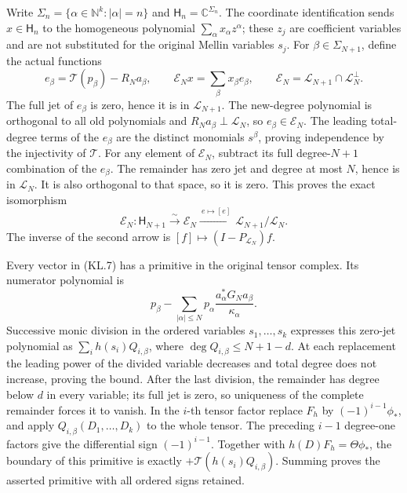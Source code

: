Write \(\Sigma_n=\{\alpha\in\mathbb N^k:|\alpha|=n\}\)
and \(\mathsf H_n=\mathbb C^{\Sigma_n}\).  The coordinate
identification sends \(x\in\mathsf H_n\) to the homogeneous
polynomial \(\sum_\alpha x_\alpha z^\alpha\); these \(z_j\)
are coefficient variables and are not substituted for the original
Mellin variables \(s_j\).
For \(\beta\in\Sigma_{N+1}\), define the actual functions
\[
 e_\beta=\mathcal T(p_\beta)-R_Na_\beta,
 \qquad \mathscr E_N x=\sum_\beta x_\beta e_\beta,
 \qquad
 \mathcal E_N=\mathcal L_{N+1}\cap\mathcal L_N^\perp.
                                                               \tag{KL.7}
\]
The full jet of \(e_\beta\) is zero, hence it is in
\(\mathcal L_{N+1}\).  The new-degree polynomial is orthogonal
to all old polynomials and \(R_Na_\beta\perp\mathcal L_N\),
so \(e_\beta\in\mathcal E_N\).
The leading total-degree terms of the \(e_\beta\) are the distinct
monomials \(s^\beta\), proving independence by the injectivity of
\(\mathcal T\).  For any element of \(\mathcal E_N\), subtract
its full degree-\(N+1\) combination of the \(e_\beta\).  The
remainder has zero jet and degree at most \(N\), hence is in
\(\mathcal L_N\).  It is also orthogonal to that space, so it is
zero.  This proves the exact isomorphism
\[
 \mathscr E_N:\mathsf H_{N+1}\xrightarrow{\sim}\mathcal E_N
       \xrightarrow{\ e\mapsto[e]\ }
                            \mathcal L_{N+1}/\mathcal L_N.
                                                               \tag{KL.8}
\]
The inverse of the second arrow is \([f]\mapsto(I-P_{\mathcal L_N})f\).

Every vector in (KL.7) has a primitive in the original tensor complex.
Its numerator polynomial is
\[
 p_\beta-\sum_{|\alpha|\leq N}
           p_\alpha\frac{a_\alpha^*G_Na_\beta}{\kappa_\alpha}.
                                                               \tag{KL.9}
\]
Successive monic division in the ordered variables
\(s_1,\ldots,s_k\) expresses this zero-jet polynomial as
\(\sum_i h(s_i)Q_{i,\beta}\), where
\(\deg Q_{i,\beta}\leq N+1-d\).  At each replacement the
leading power of the divided variable decreases and total degree
does not increase, proving the bound.  After the last division,
the remainder has degree below \(d\) in every variable; its full
jet is zero, so uniqueness of the complete remainder forces it to
vanish.  In the \(i\)-th tensor factor replace \(F_h\) by
\((-1)^{i-1}\phi_*\), and apply \(Q_{i,\beta}(D_1,\ldots,D_k)\)
to the whole tensor.  The preceding \(i-1\) degree-one factors
give the differential sign \((-1)^{i-1}\).  Together with
\(h(D)F_h=\Theta\phi_*\), the boundary of this primitive is
exactly \(+\mathcal T(h(s_i)Q_{i,\beta})\).  Summing proves
the asserted primitive with all ordered signs retained.

